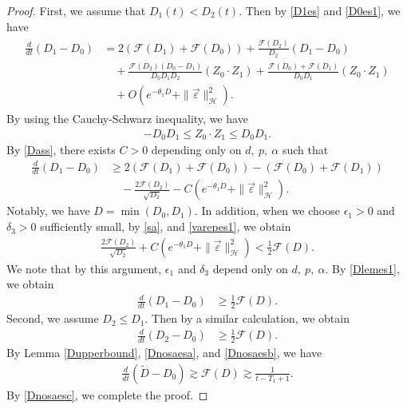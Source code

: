 \documentclass[reqno]{amsart}
\theoremstyle{plain}
\theoremstyle{definition}
\numberwithin{equation}{section}
\newcommand{\1}{\mathbbm{1}}
\begin{document}
\begin{proof}
First, we assume that $D_1(t)<D_2(t)$. Then by \eqref{D1es} and \eqref{D0es1}, we have
\begin{align}\label{sanoes1}
\begin{aligned}
\frac{d}{dt}(D_1-D_0)&=2(\mathcal{F}(D_1)+\mathcal{F}(D_0))+\frac{\mathcal{F}(D_2)}{D_2}(D_1-D_0)
\\
&\quad +\frac{\mathcal{F}(D_2)(D_0-D_1)}{D_0D_1D_2}(Z_0\cdot Z_1)+\frac{\mathcal{F}(D_0)+\mathcal{F}(D_1)}{D_0D_1}(Z_0\cdot Z_1)
\\
&\quad +O(e^{-\theta_1 D}+\|\vec{\varepsilon}\|_{\mathcal{H}}^2).
\end{aligned}
\end{align}
By using the Cauchy-Schwarz inequality, we have
\begin{align*}
-D_0D_1\leq Z_0\cdot Z_1\leq D_0D_1.
\end{align*}
By \eqref{Dass}, there exists $C>0$ depending only on $d,\ p,\ \alpha$ such that
\begin{align*}
\frac{d}{dt}(D_1-D_0)&\geq 2(\mathcal{F}(D_1)+\mathcal{F}(D_0))-(\mathcal{F}(D_0)+\mathcal{F}(D_1))
\\
&\quad-\frac{2\mathcal{F}(D_2)}{\sqrt{D_2}}-C\left(e^{-\theta_1 D}+\|\vec{\varepsilon}\|_{\mathcal{H}}^2\right).
\end{align*}
Notably, we have $D=\min{(D_0,D_1)}$. In addition, when we choose $\epsilon_1>0$ and $\delta_3>0$ sufficiently small, by \eqref{sa}, and \eqref{varepes1}, we obtain
\begin{align}\label{Dlemes1}
\frac{2\mathcal{F}(D_2)}{\sqrt{D_2}}+C\left(e^{-\theta_1 D}+\|\vec{\varepsilon}\|_{\mathcal{H}}^2\right)<\frac{1}{2}\mathcal{F}(D).
\end{align}
We note that by this argument, $\epsilon_1$ and $\delta_3$ depend only on $d,\ p,\ \alpha$. By \eqref{Dlemes1}, we obtain 
\begin{align}\label{Dnosaesa}
\frac{d}{dt}(D_1-D_0)&\geq \frac{1}{2}\mathcal{F}(D).
\end{align}
Second, we assume $D_2\leq D_1$. Then by a similar calculation, we obtain 
\begin{align}\label{Dnosaesb}
\frac{d}{dt}(D_2-D_0)&\geq \frac{1}{2}\mathcal{F}(D).
\end{align}
By Lemma \ref{Dupperbound}, \eqref{Dnosaesa}, and \eqref{Dnosaesb}, we have
\begin{align}\label{Dnosaesc}
\frac{d}{dt}(\tilde{D}-D_0)\gtrsim \mathcal{F}(D)\gtrsim \frac{1}{t-T_1+1}.
\end{align}
By \eqref{Dnosaesc}, we complete the proof.

 
\end{proof}
\end{document}
